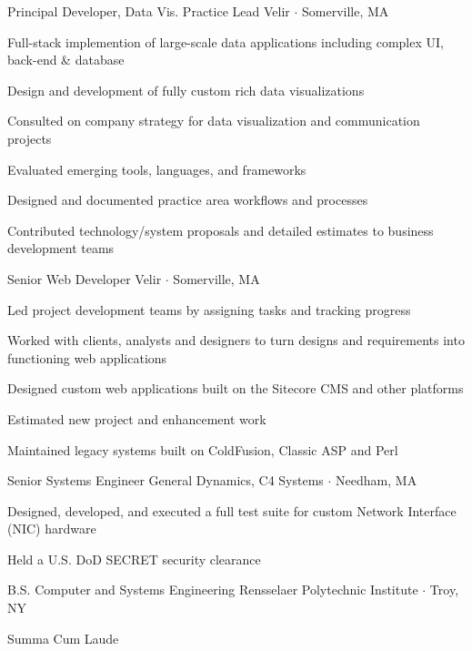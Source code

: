 \documentclass[11.5pt]{article}
\begin{document}
\begin{multicols}{2}
{Principal Developer, Data Vis. Practice Lead}
{Velir $\cdot$ Somerville, MA}{%
\begin{itemize*}
  \setlength\itemsep{0.4em}
  \item Full-stack implemention of large-scale data applications including complex UI, back-end \& database
  \item Design and development of fully custom rich data visualizations
  \item Consulted on company strategy for data visualization and communication projects
  \item Evaluated emerging tools, languages, and frameworks
  \item Designed and documented practice area workflows and processes
  \item Contributed technology/system proposals and detailed estimates to business development teams
\end{itemize*}
}

\vfill\null
\columnbreak

{Senior Web Developer}
{Velir $\cdot$ Somerville, MA}{%
\begin{itemize*}
  \setlength\itemsep{0.4em}
  \item Led project development teams by assigning tasks and tracking progress
  \item Worked with clients, analysts and designers to turn designs and requirements into functioning web applications
  \item Designed custom web applications built on the Sitecore CMS and other platforms
  \item Estimated new project and enhancement work
  \item Maintained legacy systems built on ColdFusion, Classic ASP and Perl
\end{itemize*}
}

{Senior Systems Engineer}
{General Dynamics, C4 Systems $\cdot$ Needham, MA}{%
\begin{itemize*}
  \setlength\itemsep{0.4em}
  \item Designed, developed, and executed a full test suite for custom Network Interface (NIC) hardware
  \item Held a U.S. DoD SECRET security clearance
\end{itemize*}
}

{B.S. Computer and Systems Engineering}
{Rensselaer Polytechnic Institute $\cdot$ Troy, NY}{%
\begin{itemize*}
  \setlength\itemsep{0.4em}
  \item Summa Cum Laude
\end{itemize*}
}
\end{multicols}
\end{document}
